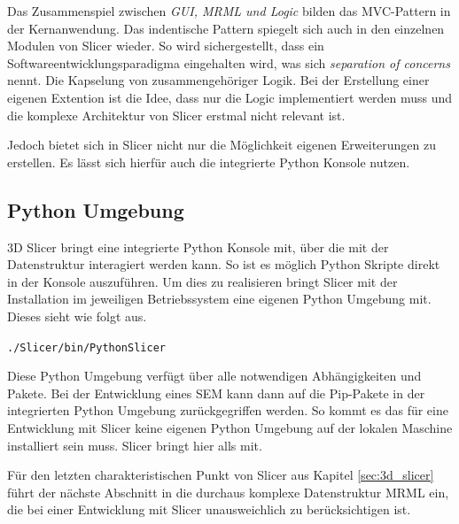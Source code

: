 Das Zusammenspiel zwischen \textit{GUI, MRML und Logic} bilden das MVC-Pattern in
der Kernanwendung. Das indentische Pattern spiegelt sich auch in den einzelnen
Modulen von Slicer wieder. So wird sichergestellt, dass ein
Softwareentwicklungsparadigma eingehalten wird, was sich \textit{separation of
concerns} nennt. Die Kapselung von zusammengehöriger Logik. Bei der Erstellung
einer eigenen Extention ist die Idee, dass nur die Logic implementiert werden muss
und die komplexe Architektur von Slicer erstmal nicht relevant ist.

Jedoch bietet sich in Slicer nicht nur die Möglichkeit eigenen Erweiterungen zu erstellen.
Es lässt sich hierfür auch die integrierte Python Konsole nutzen.

\subsection{Python Umgebung}
\label{subsec:pythob_umgebung} 3D Slicer bringt eine integrierte Python Konsole
mit, über die mit der Datenstruktur interagiert werden kann. So ist es möglich
Python Skripte direkt in der Konsole auszuführen. Um dies zu realisieren bringt Slicer
mit der Installation im jeweiligen Betriebssystem eine eigenen Python Umgebung mit.
Dieses sieht wie folgt aus.

\texttt{./Slicer/bin/PythonSlicer}

Diese Python Umgebung verfügt über alle notwendigen Abhängigkeiten und Pakete. Bei
der Entwicklung eines SEM kann dann auf die Pip-Pakete in der integrierten Python
Umgebung zurückgegriffen werden. So kommt es das für eine Entwicklung mit Slicer
keine eigenen Python Umgebung auf der lokalen Maschine installiert sein muss. Slicer
bringt hier alls mit.

Für den letzten charakteristischen Punkt von Slicer aus Kapitel \ref{sec:3d_slicer}
führt der nächste Abschnitt in die durchaus komplexe Datenstruktur MRML ein, die
bei einer Entwicklung mit Slicer unausweichlich zu berücksichtigen ist.

